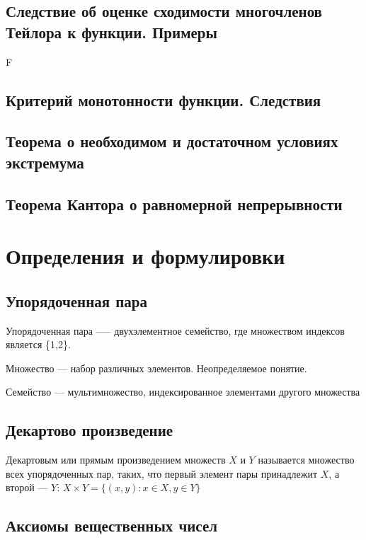 \subsection{Следствие об оценке сходимости многочленов Тейлора к функции. Примеры}
F
\subsection{Критерий монотонности функции. Следствия}
\begin{theorem*}

\end{theorem*}
\subsection{Теорема о необходимом и достаточном условиях экстремума}
\subsection{Теорема Кантора о равномерной непрерывности}

\newpage
\section{Определения и формулировки}
\setcounter{subsection}{2}

\subsection{Упорядоченная пара}
Упорядоченная пара {—--} двухэлементное семейство, где множеством индексов является \{1,2\}.

Множество {---} набор различных элементов. Неопределяемое понятие.

Семейство {---} мультимножество, индексированное элементами другого множества

\newpage
\subsection{Декартово произведение}
Декартовым или прямым произведением множеств $X$ и $Y$ называется множество всех упорядоченных пар, таких, что первый элемент пары принадлежит $X$, а второй — $Y$:
$X \times Y = \{(x,y):x \in X,y\in Y\}$

\newpage
\subsection{Аксиомы вещественных чисел}
